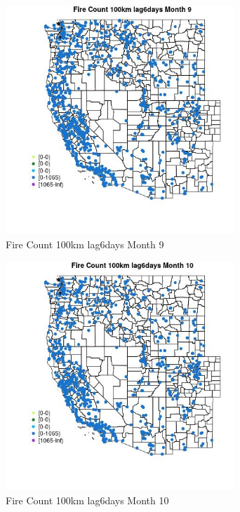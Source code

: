 \begin{figure} 
\centering  
\includegraphics[width=0.77\textwidth]{Code_Outputs/Report_ML_input_PM25_Step4_part_f_de_duplicated_aves_prioritize_24hr_obswNAs_MapObsMo9Fire_Count_100km_lag6days.jpg} 
\caption{\label{fig:Report_ML_input_PM25_Step4_part_f_de_duplicated_aves_prioritize_24hr_obswNAsMapObsMo9Fire_Count_100km_lag6days}Fire Count 100km lag6days Month 9} 
\end{figure} 
 

\begin{figure} 
\centering  
\includegraphics[width=0.77\textwidth]{Code_Outputs/Report_ML_input_PM25_Step4_part_f_de_duplicated_aves_prioritize_24hr_obswNAs_MapObsMo10Fire_Count_100km_lag6days.jpg} 
\caption{\label{fig:Report_ML_input_PM25_Step4_part_f_de_duplicated_aves_prioritize_24hr_obswNAsMapObsMo10Fire_Count_100km_lag6days}Fire Count 100km lag6days Month 10} 
\end{figure} 
 

